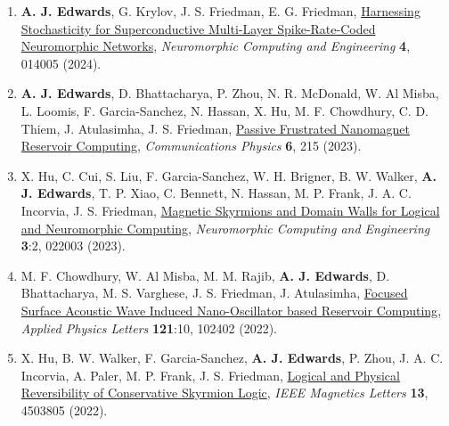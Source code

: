 \documentclass[12pt]{article}
\begin{document}
\begin{enumerate}
\item \textbf{A. J. Edwards}, G. Krylov, J. S. Friedman, E. G. Friedman, \href{https://iopscience.iop.org/article/10.1088/2634-4386/ad207a}{Harnessing Stochasticity for Superconductive Multi-Layer Spike-Rate-Coded Neuromorphic Networks}, \textit{Neuromorphic Computing and Engineering} \textbf{4}, 014005 (2024).
\item \textbf{A. J. Edwards}, D. Bhattacharya, P. Zhou, N. R. McDonald, W. Al Misba, L. Loomis, F. Garcia-Sanchez, N. Hassan, X. Hu, M. F. Chowdhury, C. D. Thiem, J. Atulasimha, J. S. Friedman, \href{https://www.nature.com/articles/s42005-023-01324-8}{Passive Frustrated Nanomagnet Reservoir Computing}, \textit{Communications Physics} \textbf{6}, 215 (2023).
\item X. Hu, C. Cui, S. Liu, F. Garcia-Sanchez, W. H. Brigner, B. W. Walker, \textbf{A. J. Edwards}, T. P. Xiao, C. Bennett, N. Hassan, M. P. Frank, J. A. C. Incorvia, J. S. Friedman, \href{https://iopscience.iop.org/article/10.1088/2634-4386/acc6e8/meta}{Magnetic Skyrmions and Domain Walls for Logical and Neuromorphic Computing}, \textit{Neuromorphic Computing and Engineering} \textbf{3}:2, 022003 (2023).
\item M. F. Chowdhury, W. Al Misba, M. M. Rajib, \textbf{A. J. Edwards}, D. Bhattacharya, M. S. Varghese, J. S. Friedman, J. Atulasimha, \href{https://aip.scitation.org/doi/10.1063/5.0110769}{Focused Surface Acoustic Wave Induced Nano-Oscillator based Reservoir Computing}, \textit{Applied Physics Letters} \textbf{121}:10, 102402 (2022).
\item X. Hu, B. W. Walker, F. Garcia-Sanchez, \textbf{A. J. Edwards}, P. Zhou, J. A. C. Incorvia, A. Paler, M. P. Frank, J. S. Friedman, \href{https://ieeexplore.ieee.org/document/9772937}{Logical and Physical Reversibility of Conservative Skyrmion Logic}, \textit{IEEE Magnetics Letters} \textbf{13}, 4503805 (2022).


\end{enumerate}
\end{document}
